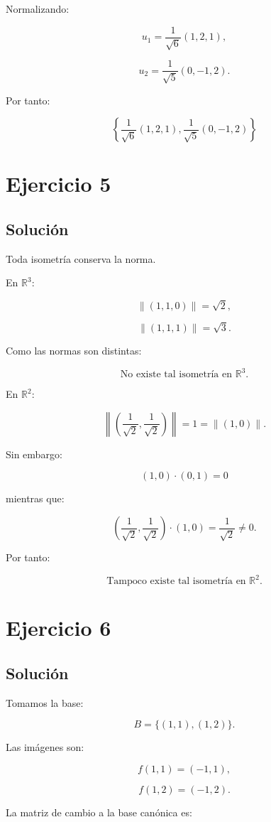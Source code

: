 \documentclass[11pt,a4paper]{article}
\newcommand{\R}{\mathbb{R}}
\begin{document}
Normalizando:

\[
u_1
=
\frac1{\sqrt6}(1,2,1),
\]

\[
u_2
=
\frac1{\sqrt5}(0,-1,2).
\]

Por tanto:

\[
\boxed{
\left\{
\frac1{\sqrt6}(1,2,1),
\frac1{\sqrt5}(0,-1,2)
\right\}
}
\]

\section{Ejercicio 5}
\subsection{Solución}

Toda isometría conserva la norma.

En \(\R^3\):

\[
\|(1,1,0)\|
=
\sqrt2,
\]

\[
\|(1,1,1)\|
=
\sqrt3.
\]

Como las normas son distintas:

\[
\boxed{
\text{No existe tal isometría en }\R^3.
}
\]

En \(\R^2\):

\[
\left\|
\left(
\frac1{\sqrt2},
\frac1{\sqrt2}
\right)
\right\|
=
1
=
\|(1,0)\|.
\]

Sin embargo:

\[
(1,0)\cdot(0,1)=0
\]

mientras que:

\[
\left(
\frac1{\sqrt2},
\frac1{\sqrt2}
\right)
\cdot
(1,0)
=
\frac1{\sqrt2}\neq0.
\]

Por tanto:

\[
\boxed{
\text{Tampoco existe tal isometría en }\R^2.
}
\]

\section{Ejercicio 6}
\subsection{Solución}

Tomamos la base:

\[
B=
\{(1,1),(1,2)\}.
\]

Las imágenes son:

\[
f(1,1)=(-1,1),
\]

\[
f(1,2)=(-1,2).
\]

La matriz de cambio a la base canónica es:
\end{document}
